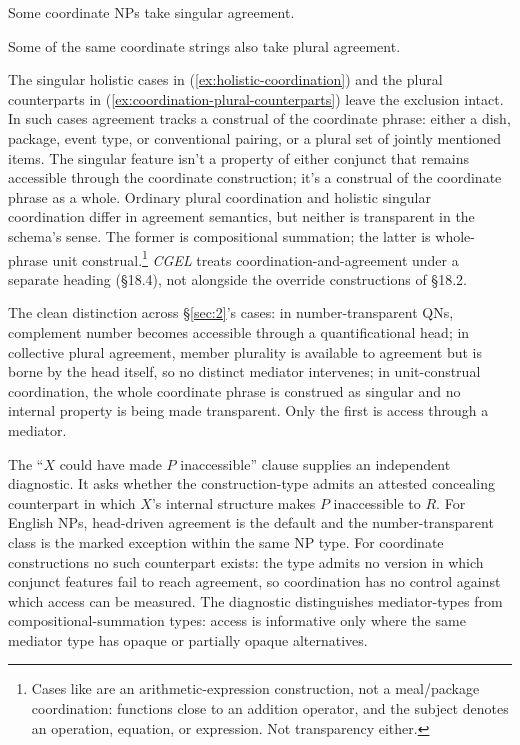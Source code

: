 Some coordinate NPs take singular agreement.

\ea\label{ex:holistic-coordination}
\ea {}
\ex {}
\ex {}
\z
\z

Some of the same coordinate strings also take plural agreement.

\ea\label{ex:coordination-plural-counterparts}
\ea {}
\ex {}
\z
\z

The singular holistic cases in (\ref{ex:holistic-coordination}) and the plural counterparts in (\ref{ex:coordination-plural-counterparts}) leave the exclusion intact. In such cases agreement tracks a construal of the coordinate phrase: either a dish, package, event type, or conventional pairing, or a plural set of jointly mentioned items. The singular feature isn't a property of either conjunct that remains accessible through the coordinate construction; it's a construal of the coordinate phrase as a whole. Ordinary plural coordination and holistic singular coordination differ in agreement semantics, but neither is transparent in the schema's sense. The former is compositional summation; the latter is whole-phrase unit construal.\footnote{Cases like  are an arithmetic-expression construction, not a meal/package coordination:  functions close to an addition operator, and the subject denotes an operation, equation, or expression. Not transparency either.} \textit{CGEL} treats coordination-and-agreement under a separate heading (§18.4), not alongside the override constructions of §18.2.

The clean distinction across §\ref{sec:2}'s cases: in number-transparent QNs, complement number becomes accessible through a quantificational head; in collective plural agreement, member plurality is available to agreement but is borne by the head itself, so no distinct mediator intervenes; in unit-construal coordination, the whole coordinate phrase is construed as singular and no internal property is being made transparent. Only the first is access through a mediator.

The \enquote{$X$ could have made $P$ inaccessible} clause supplies an independent diagnostic. It asks whether the construction-type admits an attested concealing counterpart in which $X$'s internal structure makes $P$ inaccessible to $R$. For English NPs, head-driven agreement is the default and the number-transparent class is the marked exception within the same NP type. For coordinate constructions no such counterpart exists: the type admits no version in which conjunct features fail to reach agreement, so coordination has no control against which access can be measured. The diagnostic distinguishes mediator-types from compositional-summation types: access is informative only where the same mediator type has opaque or partially opaque alternatives.


